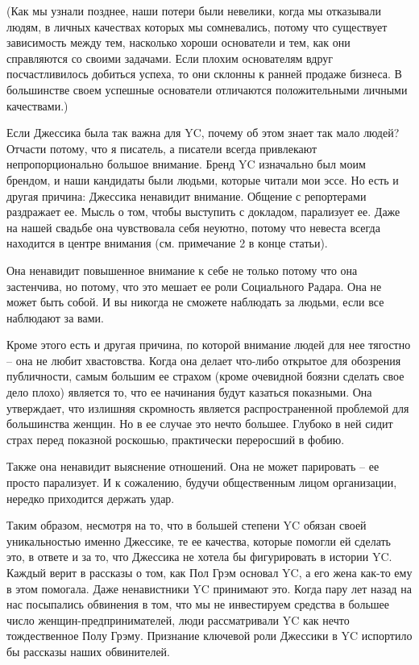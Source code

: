 \documentclass[ebook,12pt,oneside,openany]{memoir}
\begin{document}
(Как мы узнали позднее, наши потери были невелики, когда мы отказывали
людям, в личных качествах которых мы сомневались, потому что
существует зависимость между тем, насколько хороши основатели и тем,
как они справляются со своими задачами. Если плохим основателям вдруг
посчастливилось добиться успеха, то они склонны к ранней продаже
бизнеса. В большинстве своем успешные основатели отличаются
положительными личными качествами.)

Если Джессика была так важна для YC, почему об этом знает так мало
людей? Отчасти потому, что я писатель, а писатели всегда привлекают
непропорционально большое внимание. Бренд YC изначально был моим
брендом, и наши кандидаты были людьми, которые читали мои эссе. Но
есть и другая причина: Джессика ненавидит внимание. Общение с
репортерами раздражает ее. Мысль о том, чтобы выступить с докладом,
парализует ее. Даже на нашей свадьбе она чувствовала себя неуютно,
потому что невеста всегда находится в центре внимания (см. примечание
2 в конце статьи).

Она ненавидит повышенное внимание к себе не только потому что она
застенчива, но потому, что это мешает ее роли Социального Радара. Она
не может быть собой. И вы никогда не сможете наблюдать за людьми, если
все наблюдают за вами.

Кроме этого есть и другая причина, по которой внимание людей для нее
тягостно – она не любит хвастовства. Когда она делает что-либо
открытое для обозрения публичности, самым большим ее страхом (кроме
очевидной боязни сделать свое дело плохо) является то, что ее
начинания будут казаться показными. Она утверждает, что излишняя
скромность является распространенной проблемой для большинства женщин.
Но в ее случае это нечто большее. Глубоко в ней сидит страх перед
показной роскошью, практически переросший в фобию.

Также она ненавидит выяснение отношений. Она не может парировать – ее
просто парализует. И к сожалению, будучи общественным лицом
организации, нередко приходится держать удар.

Таким образом, несмотря на то, что в большей степени YC обязан своей
уникальностью именно Джессике, те ее качества, которые помогли ей
сделать это, в ответе и за то, что Джессика не хотела бы фигурировать
в истории YC. Каждый верит в рассказы о том, как Пол Грэм основал YC,
а его жена как-то ему в этом помогала. Даже ненавистники YC принимают
это. Когда пару лет назад на нас посыпались обвинения в том, что мы не
инвестируем средства в большее число женщин-предпринимателей, люди
рассматривали YC как нечто тождественное Полу Грэму. Признание
ключевой роли Джессики в YC испортило бы рассказы наших обвинителей.
\end{document}
